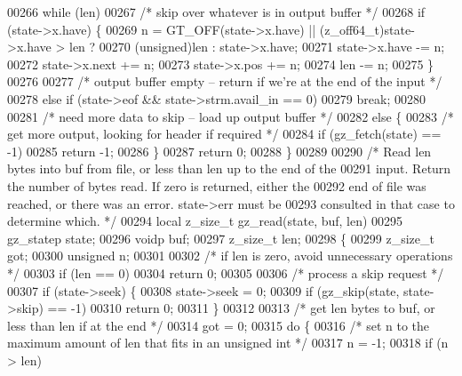 \begin{DoxyCode}
00266     \textcolor{keywordflow}{while} (len)
00267         \textcolor{comment}{/* skip over whatever is in output buffer */}
00268         \textcolor{keywordflow}{if} (state->x.have) \{
00269             n = GT\_OFF(state->x.have) || (z\_off64\_t)state->x.have > len ?
00270                 (\textcolor{keywordtype}{unsigned})len : state->x.have;
00271             state->x.have -= n;
00272             state->x.next += n;
00273             state->x.pos += n;
00274             len -= n;
00275         \}
00276 
00277         \textcolor{comment}{/* output buffer empty -- return if we're at the end of the input */}
00278         \textcolor{keywordflow}{else} \textcolor{keywordflow}{if} (state->eof && state->strm.avail\_in == 0)
00279             \textcolor{keywordflow}{break};
00280 
00281         \textcolor{comment}{/* need more data to skip -- load up output buffer */}
00282         \textcolor{keywordflow}{else} \{
00283             \textcolor{comment}{/* get more output, looking for header if required */}
00284             \textcolor{keywordflow}{if} (gz\_fetch(state) == -1)
00285                 \textcolor{keywordflow}{return} -1;
00286         \}
00287     \textcolor{keywordflow}{return} 0;
00288 \}
00289 
00290 \textcolor{comment}{/* Read len bytes into buf from file, or less than len up to the end of the}
00291 \textcolor{comment}{   input.  Return the number of bytes read.  If zero is returned, either the}
00292 \textcolor{comment}{   end of file was reached, or there was an error.  state->err must be}
00293 \textcolor{comment}{   consulted in that case to determine which. */}
00294 local z\_size\_t gz\_read(state, buf, len)
00295     gz\_statep state;
00296     voidp buf;
00297     z\_size\_t len;
00298 \{
00299     z\_size\_t got;
00300     \textcolor{keywordtype}{unsigned} n;
00301 
00302     \textcolor{comment}{/* if len is zero, avoid unnecessary operations */}
00303     \textcolor{keywordflow}{if} (len == 0)
00304         \textcolor{keywordflow}{return} 0;
00305 
00306     \textcolor{comment}{/* process a skip request */}
00307     \textcolor{keywordflow}{if} (state->seek) \{
00308         state->seek = 0;
00309         \textcolor{keywordflow}{if} (gz\_skip(state, state->skip) == -1)
00310             \textcolor{keywordflow}{return} 0;
00311     \}
00312 
00313     \textcolor{comment}{/* get len bytes to buf, or less than len if at the end */}
00314     got = 0;
00315     \textcolor{keywordflow}{do} \{
00316         \textcolor{comment}{/* set n to the maximum amount of len that fits in an unsigned int */}
00317         n = -1;
00318         \textcolor{keywordflow}{if} (n > len)

\end{DoxyCode}
